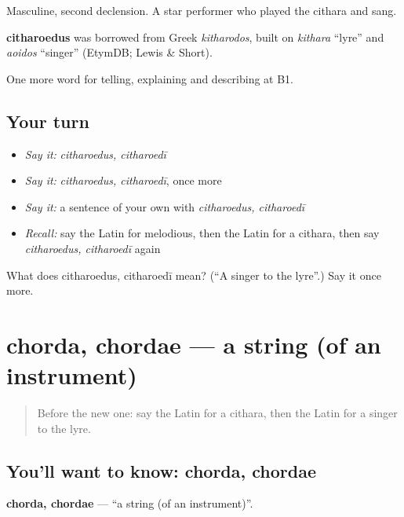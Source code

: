Masculine, second declension. A star performer who played the cithara and sang.

\begin{cousinweb}
\textbf{citharoedus} was borrowed from Greek \emph{kitharodos}, built on \emph{kithara} \textquotedblleft{}lyre\textquotedblright{} and \emph{aoidos} \textquotedblleft{}singer\textquotedblright{} (EtymDB; Lewis \& Short).
\end{cousinweb}

\begin{grammarlens}[title={What you've built}]
One more word for telling, explaining and describing at B1.
\end{grammarlens}

\subsection*{Your turn}
\begin{itemize}
\raggedright
  \item \emph{Say it:} \emph{citharoedus, citharoedī}
  \item \emph{Say it:} \emph{citharoedus, citharoedī}, once more
  \item \emph{Say it:} a sentence of your own with \emph{citharoedus, citharoedī}
  \item \emph{Recall:} say the Latin for melodious, then the Latin for a cithara, then say \emph{citharoedus, citharoedī} again
\end{itemize}

\begin{tcolorbox}[breakable,colback=teal!4,colframe=teal!35!black,title={Before you move on}]
What does citharoedus, citharoedī mean? (\textquotedblleft{}A singer to the lyre\textquotedblright{}.) Say it once more.
\end{tcolorbox}
\section[chorda, chordae]{chorda, chordae — a string (of an instrument)}

\label{lesson:LA-C544-chorda}



\begin{quote}
Before the new one: say the Latin for a cithara, then the Latin for a singer to the lyre.
\end{quote}

\subsection*{You'll want to know: chorda, chordae}
\textbf{chorda, chordae} — \textquotedblleft{}a string (of an instrument)\textquotedblright{}.

